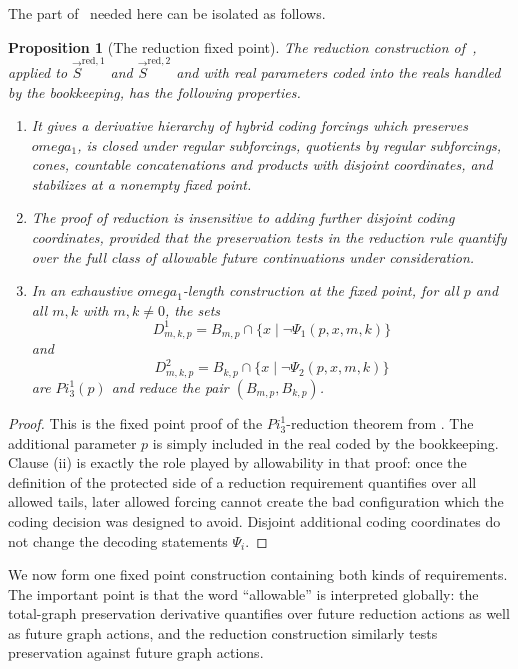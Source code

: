 \documentclass{article}
\newtheorem{proposition}[theorem]{Proposition}
\theoremstyle{remark}
\theoremstyle{plain}
\def\mathbf#1{#1}%
\def\Pi{Pi}%
\def\omega{omega}%
\begin{document}
The part of~\cite{HOFFELNER2023103292} needed here can be isolated as follows.

\begin{proposition}[The reduction fixed point]\label{prop:reduction-blackbox}
The reduction construction of~\cite[Section~3]{HOFFELNER2023103292}, applied to
$\vec S^{\mathrm{red},1}$ and $\vec S^{\mathrm{red},2}$ and with real parameters
coded into the reals handled by the bookkeeping, has the following properties.
\begin{enumerate}[label=\textup{(\roman*)}]
\item It gives a derivative hierarchy of hybrid coding forcings which preserves
$\omega_1$, is closed under regular subforcings, quotients by regular
subforcings, cones, countable concatenations and products with disjoint
coordinates, and stabilizes at a nonempty fixed point.
\item The proof of reduction is insensitive to adding further disjoint coding
coordinates, provided that the preservation tests in the reduction rule quantify
over the full class of allowable future continuations under consideration.
\item In an exhaustive $\omega_1$-length construction at the fixed point, for
all $p$ and all $m,k$ with $m,k\neq0$, the sets
\[
   D^1_{m,k,p}=B_{m,p}\cap\{x\mid \neg\Psi_1(p,x,m,k)\}
\]
and
\[
   D^2_{m,k,p}=B_{k,p}\cap\{x\mid \neg\Psi_2(p,x,m,k)\}
\]
are $\mathbf{\Pi}^1_3(p)$ and reduce the pair $(B_{m,p},B_{k,p})$.
\end{enumerate}
\end{proposition}

\begin{proof}
This is the fixed point proof of the $\mathbf{\Pi}^1_3$-reduction theorem from
\cite{HOFFELNER2023103292}. The additional parameter $p$ is simply included in
the real coded by the bookkeeping. Clause (ii) is exactly the role played by
allowability in that proof: once the definition of the protected side of a
reduction requirement quantifies over all allowed tails, later allowed forcing
cannot create the bad configuration which the coding decision was designed to
avoid. Disjoint additional coding coordinates do not change the decoding
statements $\Psi_i$.
\end{proof}

We now form one fixed point construction containing both kinds of requirements.
The important point is that the word ``allowable'' is interpreted globally: the
total-graph preservation derivative quantifies over future reduction actions as
well as future graph actions, and the reduction construction similarly tests
preservation against future graph actions.
\end{document}
